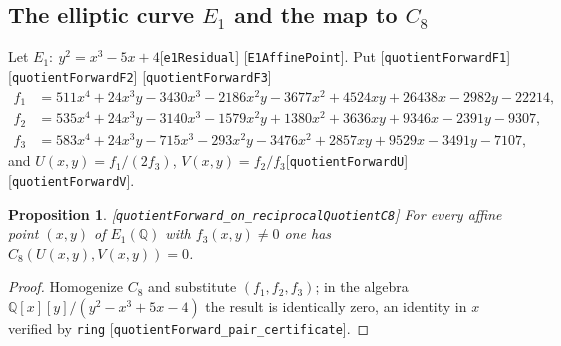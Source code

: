 \documentclass[10pt]{article}
\newtheorem{proposition}[theorem]{Proposition}
\theoremstyle{definition}
\theoremstyle{remark}
\newcommand{\Q}{\mathbb{Q}}
\newcommand{\leanref}[1]{{\scriptsize\textup{[\texttt{#1}]}}\allowbreak}
\begin{document}
\subsection{The elliptic curve \texorpdfstring{$E_1$}{E1} and the map to \texorpdfstring{$C_8$}{C8}}\label{sec:E1}

Let $E_1:\ y^2=x^3-5x+4$\leanref{e1\allowbreak Residual} \leanref{E1\allowbreak Affine\allowbreak Point}.  Put
\leanref{quotient\allowbreak Forward\allowbreak F1} \leanref{quotient\allowbreak Forward\allowbreak F2} \leanref{quotient\allowbreak Forward\allowbreak F3}
\begin{align*}
f_1&=511x^4+24x^3y-3430x^3-2186x^2y-3677x^2+4524xy+26438x-2982y-22214,\\
f_2&=535x^4+24x^3y-3140x^3-1579x^2y+1380x^2+3636xy+9346x-2391y-9307,\\
f_3&=583x^4+24x^3y-715x^3-293x^2y-3476x^2+2857xy+9529x-3491y-7107,
\end{align*}
and $U(x,y)=f_1/(2f_3)$, $V(x,y)=f_2/f_3$\leanref{quotient\allowbreak Forward\allowbreak U} \leanref{quotient\allowbreak Forward\allowbreak V}.

\begin{proposition}\label{prop:forward}
\leanref{quotient\allowbreak Forward\_\allowbreak on\_\allowbreak reciprocal\allowbreak Quotient\allowbreak C8}
For every affine point $(x,y)$ of $E_1(\Q)$ with $f_3(x,y)\ne0$ one has
$C_8(U(x,y),V(x,y))=0$.
\end{proposition}
\begin{proof}
Homogenize $C_8$ and substitute $(f_1,f_2,f_3)$; in the algebra
$\Q[x][y]/(y^2-x^3+5x-4)$ the result is identically zero, an identity in
$x$ verified by \texttt{ring} \leanref{quotient\allowbreak Forward\_\allowbreak pair\_\allowbreak certificate}.
\end{proof}
\end{document}
